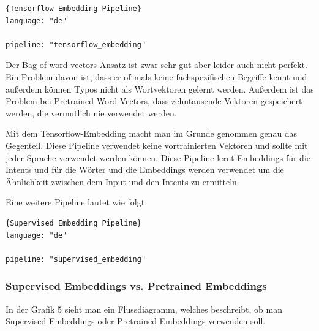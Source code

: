 \begin{lstlisting}[label={lst:tensorflow-embedding-pipeline},caption={Tensorflow Embedding Pipeline}]{Tensorflow Embedding Pipeline}
language: "de"

pipeline: "tensorflow_embedding"
\end{lstlisting}

Der Bag-of-word-vectors Ansatz ist zwar sehr gut aber leider auch nicht perfekt.
Ein Problem davon ist, dass er oftmals keine fachspezifischen Begriffe kennt und außerdem können Typos nicht als Wortvektoren gelernt werden.
Außerdem ist das Problem bei Pretrained Word Vectors, dass zehntausende Vektoren gespeichert werden, die vermutlich nie verwendet werden.\cite{tensorFlowEmbedding, choosingPipeline}

Mit dem Tensorflow-Embedding macht man im Grunde genommen genau das Gegenteil.
Diese Pipeline verwendet keine vortrainierten Vektoren und sollte mit jeder Sprache verwendet werden können.
Diese Pipeline lernt Embeddings für die Intents und für die Wörter und die Embeddings werden verwendet um die Ähnlichkeit zwischen dem Input und den Intents zu ermitteln.\cite{tensorFlowEmbedding, choosingPipeline}

Eine weitere Pipeline lautet wie folgt:

\begin{lstlisting}[label={lst:supervised-embedding},caption={Supervised Embedding Pipeline}]{Supervised Embedding Pipeline}
language: "de"

pipeline: "supervised_embedding"
\end{lstlisting}

\subsubsection{Supervised Embeddings vs. Pretrained Embeddings}

In der Grafik 5 sieht man ein Flussdiagramm, welches beschreibt, ob man Supervised Embeddings oder Pretrained Embeddings verwenden soll.

